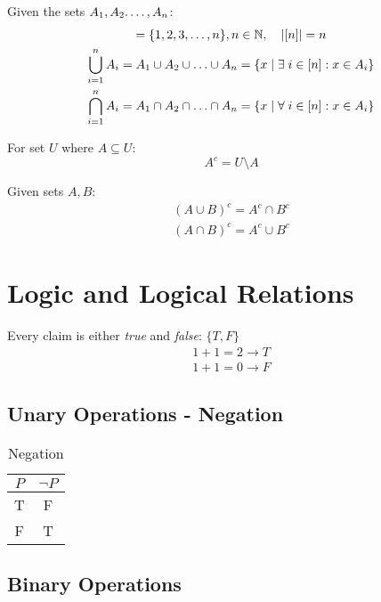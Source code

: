 \documentclass[00_complete]{subfiles}
\begin{document}
Given the sets $A_1, A_2. \mathellipsis, A_n$:
\begin{gather*}
    [n] = \{1,2,3, \mathellipsis, n\}, n \in \mathbb{N},\quad |[n]|=n \\
    \bigcup_{i=1}^{n}A_i=A_1\cup A_2 \cup \mathellipsis \cup A_n = \{ x \;|\;
    \exists \; i \in [n] : x \in A_i \} \\
    \bigcap_{i=1}^{n}A_i=A_1\cap A_2 \cap \mathellipsis \cap A_n = \{ x \;|\;
    \forall \; i \in [n] : x \in A_i \}
\end{gather*}

\begin{definition}[Compliment]
For set $U$ where $A \subseteq U$:
$$A^c = U \setminus A$$
\end{definition}

\begin{definition}
Given sets $A,B$:
\begin{gather*}
(A \cup B)^c=A^c \cap B^c \\
(A \cap B)^c=A^c \cup B^c
\end{gather*}
\end{definition}

\section{Logic and Logical Relations}

\begin{axiom}
Every claim is either \emph{true} and \emph{false}: $\{T,F\}$
\begin{gather*}
    1+1=2 \to T \\
    1+1=0 \to F
\end{gather*}
\end{axiom}

\subsection{Unary Operations - Negation}

\begin{table}[h!]
\centering
{
\begin{tabular}{cc}
 \hline
 $P$ & $\neg P$ \\
 \hline
 T & F \\
 F & T \\
 \hline
\end{tabular}}
\caption{Negation}
\end{table}

\subsection{Binary Operations}
\end{document}
